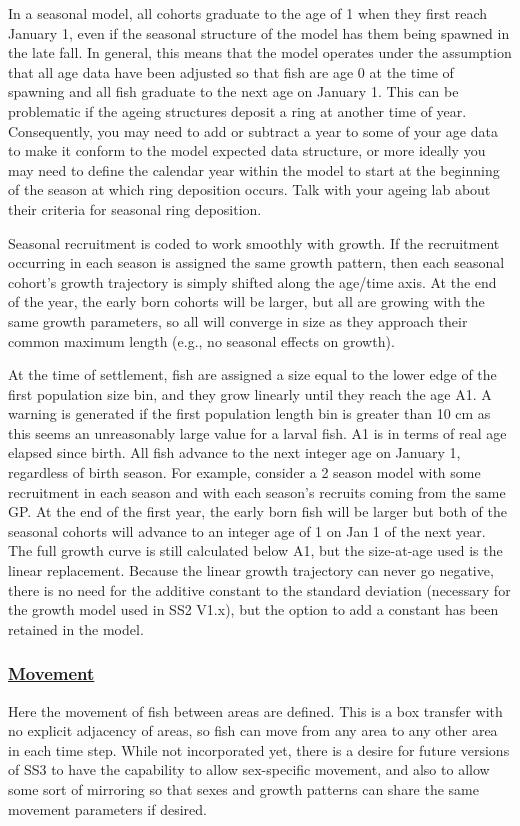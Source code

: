In a seasonal model, all cohorts graduate to the age of 1 when they first reach January 1, even if the seasonal structure of the model has them being spawned in the late fall. In general, this means that the model operates under the assumption that all age data have been adjusted so that fish are age 0 at the time of spawning and all fish graduate to the next age on January 1. This can be problematic if the ageing structures deposit a ring at another time of year. Consequently, you may need to add or subtract a year to some of your age data to make it conform to the model expected data structure, or more ideally you may need to define the calendar year within the model to start at the beginning of the season at which ring deposition occurs. Talk with your ageing lab about their criteria for seasonal ring deposition.
		
Seasonal recruitment is coded to work smoothly with growth. If the recruitment occurring in each season is assigned the same growth pattern, then each seasonal cohort's growth trajectory is simply shifted along the age/time axis. At the end of the year, the early born cohorts will be larger, but all are growing with the same growth parameters, so all will converge in size as they approach their common maximum length (e.g., no seasonal effects on growth).
	
At the time of settlement, fish are assigned a size equal to the lower edge of the first population size bin, and they grow linearly until they reach the age A1. A warning is generated if the first population length bin is greater than 10 cm as this seems an unreasonably large value for a larval fish. A1 is in terms of real age elapsed since birth. All fish advance to the next integer age on January 1, regardless of birth season. For example, consider a 2 season model with some recruitment in each season and with each season's recruits coming from the same GP. At the end of the first year, the early born fish will be larger but both of the seasonal cohorts will advance to an integer age of 1 on Jan 1 of the next year. The full growth curve is still calculated below A1, but the size-at-age used is the linear replacement. Because the linear growth trajectory can never go negative, there is no need for the additive constant to the standard deviation (necessary for the growth model used in SS2 V1.x), but the option to add a constant has been retained in the model.

\hypertarget{Movement}{}
\subsubsection[Movement]{\protect\hyperlink{Movement}{Movement}}
Here the movement of fish between areas are defined. This is a box transfer with no explicit adjacency of areas, so fish can move from any area to any other area in each time step. While not incorporated yet, there is a desire for future versions of SS3 to have the capability to allow sex-specific movement, and also to allow some sort of mirroring so that sexes and growth patterns can share the same movement parameters if desired.

